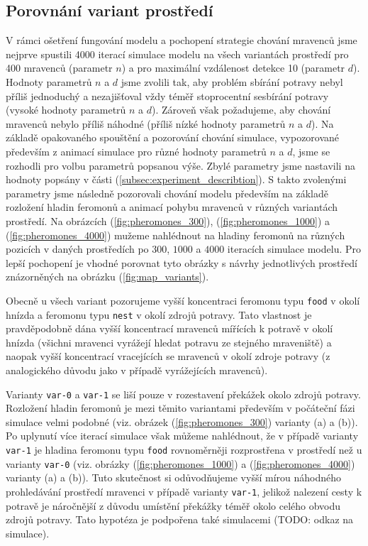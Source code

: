 \documentclass[10pt,a4paper,twocolumn]{article}
\begin{document}
\subsection{Porovnání variant prostředí}
\label{subsec:variant_comparision}

V rámci ošetření fungování modelu a pochopení strategie chování 
mravenců jsme nejprve spustili 4000 iterací simulace modelu na všech 
variantách prostředí pro 400 mravenců (parametr $n$) a pro maximální
vzdálenost detekce 10 (parametr $d$). Hodnoty parametrů $n$ a $d$ jsme zvolili tak, aby problém sbírání
potravy nebyl příliš jednoduchý a nezajišťoval vždy téměř stoprocentní
sesbírání potravy (vysoké hodnoty parametrů $n$ a $d$). Zároveň však
požadujeme, aby chování mravenců nebylo příliš náhodné 
(příliš nízké hodnoty parametrů $n$ a $d$). Na základě opakovaného 
spouštění a pozorování chování simulace, vypozorované především
z animací simulace pro různé hodnoty parametrů $n$ a $d$, 
jsme se rozhodli pro volbu parametrů popsanou výše. Zbylé parametry 
jsme nastavili na hodnoty popsány v části 
(\ref{subsec:experiment_describtion}). S takto zvolenými parametry 
jsme následně pozorovali chování modelu především na základě 
rozložení hladin feromonů a animací pohybu mravenců v různých 
variantách prostředí. Na obrázcích (\ref{fig:pheromones_300}), 
(\ref{fig:pheromones_1000}) a (\ref{fig:pheromones_4000}) 
mužeme nahlédnout na hladiny feromonů na 
různých pozicích v daných prostředích po $300$, $1000$ a $4000$ 
iteracích simulace modelu. Pro lepší pochopení je vhodné porovnat 
tyto obrázky s návrhy jednotlivých prostředí znázorněných na obrázku
(\ref{fig:map_variants}).

Obecně u všech variant pozorujeme vyšší koncentraci feromonu typu
\texttt{food} v okolí hnízda a feromonu typu \texttt{nest} v 
okolí zdrojů potravy. Tato vlastnost je pravděpodobně dána 
vyšší koncentrací mravenců mířících k potravě v okolí hnízda 
(všichni mravenci vyrážejí hledat potravu ze stejného mraveniště) a 
naopak vyšší koncentrací vracejících se mravenců v okolí zdroje
potravy (z analogického důvodu jako v případě vyrážejících mravenců).

Varianty \texttt{var-0} a \texttt{var-1} se liší pouze v rozestavení 
překážek okolo zdrojů potravy. Rozložení hladin feromonů je mezi
těmito variantami především v počáteční fázi simulace velmi podobné
(viz. obrázek (\ref{fig:pheromones_300}) varianty (a) a (b)). 
Po uplynutí více iterací 
simulace však můžeme nahlédnout, že v případě varianty \texttt{var-1}
je hladina feromonu typu \texttt{food} 
rovnoměrněji rozprostřena v prostředí než u
varianty \texttt{var-0} (viz. obrázky (\ref{fig:pheromones_1000}) a 
(\ref{fig:pheromones_4000}) varianty (a) a (b)). Tuto skutečnost
si odůvodňujeme vyšší mírou náhodného prohledávání prostředí mravenci
v případě varianty \texttt{var-1}, jelikož nalezení cesty k potravě
je náročnější z důvodu umístění překážky téměř okolo celého obvodu
zdrojů potravy. Tato hypotéza je podpořena také simulacemi (TODO: odkaz
na simulace).
\end{document}

